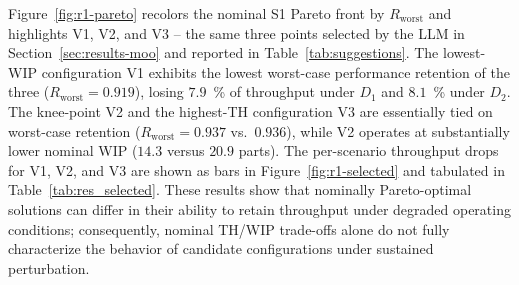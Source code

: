 \documentclass[a4paper,fleqn]{cas-sc}
\begin{document}
Figure~\ref{fig:r1-pareto} recolors the nominal S1 Pareto front by                                                                        
  $R_\mathrm{worst}$ and highlights V1, V2, and V3 -- the same three                                                                        
  points selected by the LLM in Section~\ref{sec:results-moo} and                                                                           
  reported in Table~\ref{tab:suggestions}. The lowest-WIP configuration                                                                     
  V1 exhibits the lowest worst-case performance retention of the three                                                                      
  ($R_\mathrm{worst}=0.919$), losing $7.9$~\% of throughput under $D_1$                                                                     
  and $8.1$~\% under $D_2$. The knee-point V2 and the highest-TH                                                                            
  configuration V3 are essentially tied on worst-case retention                                                                             
  ($R_\mathrm{worst}=0.937$ vs.\ $0.936$), while V2 operates at                                                                             
  substantially lower nominal WIP ($14.3$ versus $20.9$ parts).                                                                             
  The per-scenario throughput drops for V1, V2, and V3 are shown as bars                                                                    
  in Figure~\ref{fig:r1-selected} and tabulated in                                                                                          
  Table~\ref{tab:res_selected}. These results show that nominally                                                                           
  Pareto-optimal solutions can differ in their ability to retain                                                                            
  throughput under degraded operating conditions; consequently, nominal                                                                     
  TH/WIP trade-offs alone do not fully characterize the behavior of                                                                         
  candidate configurations under sustained perturbation.                                                                                                                                            
\end{document}
